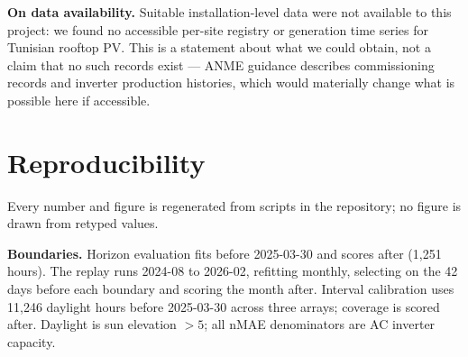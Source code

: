 \documentclass[11pt,a4paper]{article}
\begin{document}
\textbf{On data availability.} Suitable installation-level data were not
available to this project: we found no accessible per-site registry or
generation time series for Tunisian rooftop PV. This is a statement about what we
could obtain, not a claim that no such records exist --- ANME guidance describes
commissioning records and inverter production histories, which would materially
change what is possible here if accessible.

\section{Reproducibility}
\label{sec:repro}

Every number and figure is regenerated from scripts in the repository; no figure
is drawn from retyped values.

\textbf{Boundaries.} Horizon evaluation fits before 2025-03-30 and scores after
(1{,}251 hours). The replay runs 2024-08 to 2026-02, refitting monthly, selecting
on the 42 days before each boundary and scoring the month after. Interval
calibration uses 11{,}246 daylight hours before 2025-03-30 across three arrays;
coverage is scored after. Daylight is sun elevation $>5$\textdegree; all nMAE
denominators are AC inverter capacity.
\end{document}
